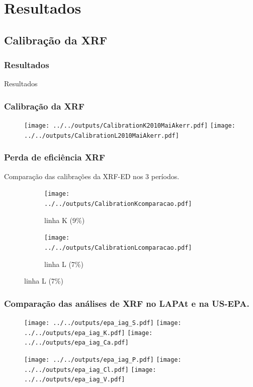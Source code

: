 \section{Resultados}

\subsection{Calibração da XRF}

\begin{frame}
	\frametitle{Resultados}
	\begin{center}
		\Huge
		Resultados
	\end{center}
\end{frame}

\begin{frame}
  \frametitle{Calibração da XRF}
  \begin{figure}
      \centering
      \texttt{[image: ../../outputs/CalibrationK2010MaiAkerr.pdf]}
      \texttt{[image: ../../outputs/CalibrationL2010MaiAkerr.pdf]}
  \end{figure}
\end{frame}

\begin{frame}
  \frametitle{Perda de eficiência XRF}
  Comparação das calibrações da XRF-ED nos 3 períodos.
  \begin{figure}[H]
    \begin{subfigure}[b]{0.5\textwidth}
      \texttt{[image: ../../outputs/CalibrationKcomparacao.pdf]}
      \caption{linha K (9\%)}
    \end{subfigure}%
    \begin{subfigure}[b]{0.5\textwidth}
      \texttt{[image: ../../outputs/CalibrationLcomparacao.pdf]}
      \caption{linha L (7\%)}
    \end{subfigure}
  \end{figure}
\end{frame}


\begin{frame}
  \frametitle{Comparação das análises de XRF no LAPAt e na US-EPA.}
  \begin{figure}[H]
    \centering
      \texttt{[image: ../../outputs/epa\_iag\_S.pdf]}
      \texttt{[image: ../../outputs/epa\_iag\_K.pdf]}
      \texttt{[image: ../../outputs/epa\_iag\_Ca.pdf]}
  \end{figure}
    \begin{figure}[H]
    	\centering
    	\texttt{[image: ../../outputs/epa\_iag\_P.pdf]}
    	\texttt{[image: ../../outputs/epa\_iag\_Cl.pdf]}
    	\texttt{[image: ../../outputs/epa\_iag\_V.pdf]}
    \end{figure}
\end{frame}

